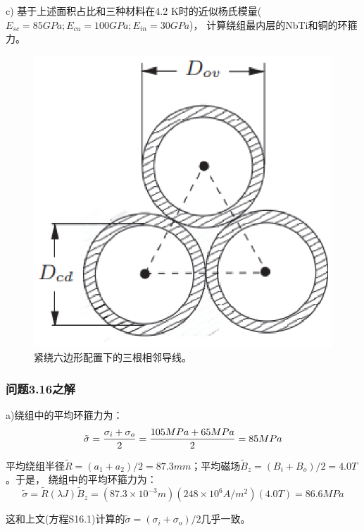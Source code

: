 c) 基于上述面积占比和三种材料在4.2 K时的近似杨氏模量($E_{sc} = 85 GPa; E_{cu} = 100 GPa; E_{in} = 30 GPa$)，
计算绕组最内层的NbTi和铜的环箍力。
\begin{figure}[htbp]
	\centering
	\includegraphics[scale=0.5]{chpt3/figs/fig3.45.eps}
	\caption{紧绕六边形配置下的三根相邻导线。}
\end{figure}


\subsubsection{问题3.16之解}
a)绕组中的平均环箍力为：
\begin{equation}
\tilde{\sigma}=\frac{\sigma_{i}+\sigma_{o}}{2}=\frac{105MPa+65MPa}{2}%
=85MPa\\
\end{equation}

平均绕组半径$\tilde{R}= (a_1 + a_2)/2=87.3 mm$；平均磁场$\tilde{B}_z = (B_i + B_o)/2=4.0 T$。于是，
绕组中的平均环箍力为：
\begin{equation}
\tilde{\sigma}=\tilde{R}(\lambda J)\tilde{B}_{z}=(87.3\times 10^{-3}m)(248\times 10^{6}A/m^{2})(4.0T)%
=86.6 MPa
\end{equation}

这和上文(方程S16.1)计算的$\tilde{\sigma}=(\sigma_i+\sigma_o)/2$几乎一致。

